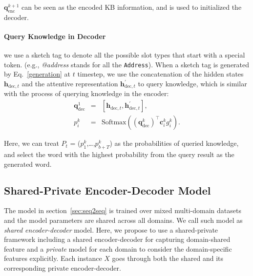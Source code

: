 \documentclass[11pt,a4paper]{article}
\begin{document}
$\boldsymbol{q}_\text{enc}^{k+1}$ can be seen as the encoded KB information, and is used to initialized the decoder.
\paragraph{Query Knowledge in Decoder} \label{decoder_query}
we use a sketch tag to denote all the possible slot types that start with a special token. (e.g., \textit{@address} stands for all the \texttt{Address}).
When a sketch tag is generated by Eq.~\ref{generation} at $t$ timestep, we use the concatenation of the hidden states ${\boldsymbol{h}}_{\text{dec}, t}$
and the attentive representation ${\boldsymbol{h}}^{'}_{\text{dec},t}$ to query knowledge, which is similar with the process of querying knowledge in the encoder:
\begin{eqnarray}
\label{decoder_initial}
 \boldsymbol{q}_\text{dec}^{1} &=& [\boldsymbol{h}^{}_{\text{dec}, t}, \boldsymbol{h}^{'}_{\text{dec}, t}], \\
p^k_i &=& \text{Softmax}((\boldsymbol{q}_\text{dec}^k)^\top \boldsymbol{c}^k_i g^k_i).
\end{eqnarray}

Here, we can treat $P_{t}$ = ($p^k_1$,\dots,$p^{k}_{b+T}$) as the probabilities of queried knowledge, and select the word with the highest probability from the query result as the generated word. 

\subsection{Shared-Private Encoder-Decoder Model} \label{sec:shared-private}
The model in section~\ref{sec:seq2seq} is trained over mixed multi-domain datasets and the model parameters are shared across all domains.
We call such model as \textit{shared encoder-decoder} model.
Here, we propose to use a shared-private framework including a shared encoder-decoder for capturing domain-shared feature and a \textit{private} model for each domain to consider the domain-specific features explicitly.
Each instance ${X}$ goes through both the shared and its corresponding private encoder-decoder.
\end{document}
